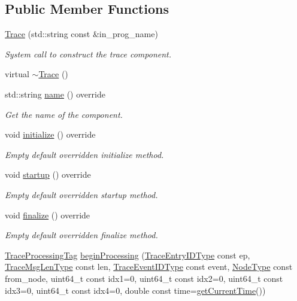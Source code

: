 \subsection*{Public Member Functions}
\begin{DoxyCompactItemize}
\item 
\hyperlink{structvt_1_1trace_1_1_trace_a2b736f560ee446cbd84aaf96e25c8d0b}{Trace} (std\+::string const \&in\+\_\+prog\+\_\+name)
\begin{DoxyCompactList}\small\item\em System call to construct the trace component. \end{DoxyCompactList}\item 
virtual \hyperlink{structvt_1_1trace_1_1_trace_a80b3426aed07572525ef4834b0c4dedd}{$\sim$\+Trace} ()
\item 
std\+::string \hyperlink{structvt_1_1trace_1_1_trace_aaae4bbf6d009229a5c8b9db67a127942}{name} () override
\begin{DoxyCompactList}\small\item\em Get the name of the component. \end{DoxyCompactList}\item 
void \hyperlink{structvt_1_1trace_1_1_trace_a24019edd964c0a307008f8d6a0f1f825}{initialize} () override
\begin{DoxyCompactList}\small\item\em Empty default overridden initialize method. \end{DoxyCompactList}\item 
void \hyperlink{structvt_1_1trace_1_1_trace_a5dd8767d9020ebeaba49ea3a684738a1}{startup} () override
\begin{DoxyCompactList}\small\item\em Empty default overridden startup method. \end{DoxyCompactList}\item 
void \hyperlink{structvt_1_1trace_1_1_trace_a571333fa708843b1b24079eccfc3ba93}{finalize} () override
\begin{DoxyCompactList}\small\item\em Empty default overridden finalize method. \end{DoxyCompactList}\item 
\hyperlink{structvt_1_1trace_1_1_trace_processing_tag}{Trace\+Processing\+Tag} \hyperlink{structvt_1_1trace_1_1_trace_a8f1a745228757b9d2ece4cd226d9540c}{begin\+Processing} (\hyperlink{namespacevt_1_1trace_a3c14050715ba9eceaeff51fb3de64f2f}{Trace\+Entry\+I\+D\+Type} const ep, \hyperlink{namespacevt_1_1trace_aeb598f45d67d41db7902e494f2f0ce59}{Trace\+Msg\+Len\+Type} const len, \hyperlink{namespacevt_1_1trace_a64a7185f3e102df8d8258f263ccd1582}{Trace\+Event\+I\+D\+Type} const event, \hyperlink{namespacevt_a866da9d0efc19c0a1ce79e9e492f47e2}{Node\+Type} const from\+\_\+node, uint64\+\_\+t const idx1=0, uint64\+\_\+t const idx2=0, uint64\+\_\+t const idx3=0, uint64\+\_\+t const idx4=0, double const time=\hyperlink{structvt_1_1trace_1_1_trace_lite_ad1d8159d645a3b7047ce3f2e0c080f8d}{get\+Current\+Time}())

\end{DoxyCompactItemize}
